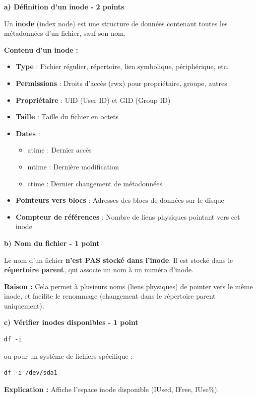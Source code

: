 \documentclass[12pt,a4paper]{article}
\begin{document}
\begin{answerbox}
\textbf{a) Définition d'un inode - 2 points}

Un \textbf{inode} (index node) est une structure de données contenant toutes les métadonnées d'un fichier, sauf son nom.

\textbf{Contenu d'un inode :}
\begin{itemize}
    \item \textbf{Type} : Fichier régulier, répertoire, lien symbolique, périphérique, etc.
    \item \textbf{Permissions} : Droits d'accès (rwx) pour propriétaire, groupe, autres
    \item \textbf{Propriétaire} : UID (User ID) et GID (Group ID)
    \item \textbf{Taille} : Taille du fichier en octets
    \item \textbf{Dates} : 
    \begin{itemize}
        \item atime : Dernier accès
        \item mtime : Dernière modification
        \item ctime : Dernier changement de métadonnées
    \end{itemize}
    \item \textbf{Pointeurs vers blocs} : Adresses des blocs de données sur le disque
    \item \textbf{Compteur de références} : Nombre de liens physiques pointant vers cet inode
\end{itemize}

\textbf{b) Nom du fichier - 1 point}

Le nom d'un fichier \textbf{n'est PAS stocké dans l'inode}. Il est stocké dans le \textbf{répertoire parent}, qui associe un nom à un numéro d'inode.

\textbf{Raison :} Cela permet à plusieurs noms (liens physiques) de pointer vers le même inode, et facilite le renommage (changement dans le répertoire parent uniquement).

\textbf{c) Vérifier inodes disponibles - 1 point}

\begin{lstlisting}
df -i
\end{lstlisting}

ou pour un système de fichiers spécifique :

\begin{lstlisting}
df -i /dev/sda1
\end{lstlisting}

\textbf{Explication :} Affiche l'espace inode disponible (IUsed, IFree, IUse\%).
\end{answerbox}
\end{document}
